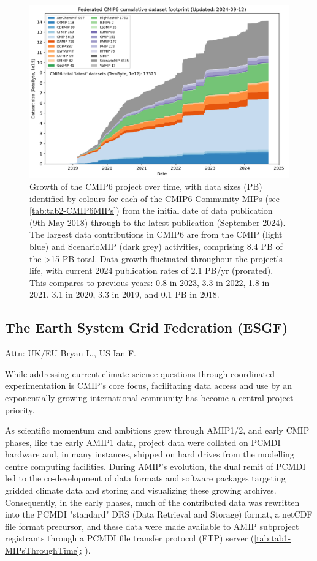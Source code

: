 \documentclass[gmd, preprint]{copernicus}
\def\cred#1{{\color{red}#1}}
\begin{document}
\begin{figure}
    \centering
    \includegraphics[width=1\linewidth]{240912T141943_ESGF-PublicationStatsPB.png}
    \caption{Growth of the CMIP6 project over time, with data sizes (PB) identified by colours for each of the CMIP6 Community MIPs (see \autoref{tab:tab2-CMIP6MIPs}) from the initial date of data publication (9th May 2018) through to the latest publication (September 2024). The largest data contributions in CMIP6 are from the CMIP (light blue) and ScenarioMIP (dark grey) activities, comprising 8.4 PB of the >15 PB total. Data growth fluctuated throughout the project's life, with current 2024 publication rates of 2.1 PB/yr (prorated). This compares to previous years: 0.8 in 2023, 3.3 in 2022, 1.8 in 2021, 3.1 in 2020, 3.3 in 2019, and 0.1 PB in 2018.}
    \label{fig:fig2-CMIP6DataGrowth}
\end{figure}


\subsection{The Earth System Grid Federation (ESGF)}
\label{sec:earthSystemGridFederation}
\cred{Attn: UK/EU Bryan L., US Ian F.}

While addressing current climate science questions through coordinated experimentation is CMIP's core focus, facilitating data access and use by an exponentially growing international community has become a central project priority. 

As scientific momentum and ambitions grew through AMIP1/2, and early CMIP phases, like the early AMIP1 data, project data were collated on PCMDI hardware and, in many instances, shipped on hard drives from the modelling centre computing facilities. During AMIP's evolution, the dual remit of PCMDI led to the co-development of data formats and software packages targeting gridded climate data and storing and visualizing these growing archives. Consequently, in the early phases, much of the contributed data was rewritten into the PCMDI "standard" DRS (Data Retrieval and Storage) format, a netCDF file format precursor, and these data were made available to AMIP subproject registrants through a PCMDI file transfer protocol (FTP) server (\autoref{tab:tab1-MIPsThroughTime}; \citet{gates_amip_1995}).
\end{document}
